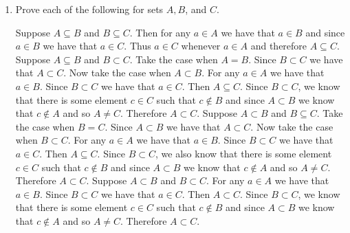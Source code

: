 \documentclass[12pt]{book}
\begin{document}
\begin{enumerate}
\begin{enumerate}
	{Let $a \in \set{x \in \mathbb{Z} \mid \text{for an integer }y,\, x = 6y}$. Then $a = 6b$ for some integer $b$. Then $a = 2 \cdot 3b$. Since $b$ is an integer, $3b$ is also an integer. Therefore $a \in \set{x \in \mathbb{Z} \mid \text{for an integer }y,\, x = 2y}$. Thus $\set{x \in \mathbb{Z} \mid \text{for an integer }y,\, x = 6y} \subseteq \set{x \in \mathbb{Z} \mid \text{for an integer }y,\, x = 2y}$. $\qed$}
	\end{enumerate}
\item Prove each of the following for sets $A, B$, and $C$.
	\begin{enumerate}
	{Suppose $A \subseteq B$ and $B \subseteq C$. Then for any $a \in A$ we have that $a \in B$ and since $a \in B$ we have that $a \in C$. Thus $a \in C$ whenever $a \in A$ and therefore $A \subseteq C$.}
	{Suppose $A \subseteq B$ and $B \subset C$. Take the case when $A = B$. Since $B \subset C$ we have that $A \subset C$. Now take the case when $A \subset B$. For any $a \in A$ we have that $a \in B$. Since $B \subset C$ we have that $a \in C$. Then $A \subseteq C$. Since $B \subset C$, we know that there is some element $c \in C$ such that $c \notin B$ and since $A \subset B$ we know that $c \notin A$ and so $A \neq C$. Therefore $A \subset C$.}
	{Suppose $A \subset B$ and $B \subseteq C$. Take the case when $B = C$. Since $A \subset B$ we have that $A \subset C$. Now take the case when $B \subset C$. For any $a \in A$ we have that $a \in B$. Since $B \subset C$ we have that $a \in C$. Then $A \subseteq C$. Since $B \subset C$, we also know that there is some element $c \in C$ such that $c \notin B$ and since $A \subset B$ we know that $c \notin A$ and so $A \neq C$. Therefore $A \subset C$.}
	{Suppose $A \subset B$ and $B \subset C$. For any $a \in A$ we have that $a \in B$. Since $B \subset C$ we have that $a \in C$. Then $A \subset C$. Since $B \subset C$, we know that there is some element $c \in C$ such that $c \notin B$ and since $A \subset B$ we know that $c \notin A$ and so $A \neq C$. Therefore $A \subset C$.}
	\end{enumerate}

\end{enumerate}
\end{document}
